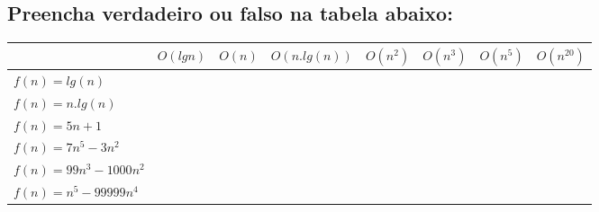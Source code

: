 \documentclass[12pt]{article}
\begin{document}
{\subsection{Preencha verdadeiro ou falso na tabela abaixo:}
\begin{table}[htb]
    \begin{tabular}{|l|l|l|l|l|l|l|l|} \hline
                              & $O(lg n)$ & $O(n)$ & $O(n.lg(n))$ & $O(n^2)$ & $O(n^3)$ & $O(n^5)$ & $O(n^20)$ \\ \hline
    $f(n) = lg(n)$            &          &         &              &          &          &          &           \\ \hline
    $f(n) = n . lg(n)$        &          &         &              &          &          &          &           \\ \hline
    $f(n) = 5n + 1$           &          &         &              &          &          &          &           \\ \hline
    $f(n) = 7n^5 - 3n^2$      &          &         &              &          &          &          &           \\ \hline
    $f(n) = 99n^3 - 1000n^2$  &          &         &              &          &          &          &           \\ \hline
    $f(n) = n^5 - 99999n^4$   &          &         &              &          &          &          &           \\ \hline
    \end{tabular}
\end{table}

}
\end{document}
